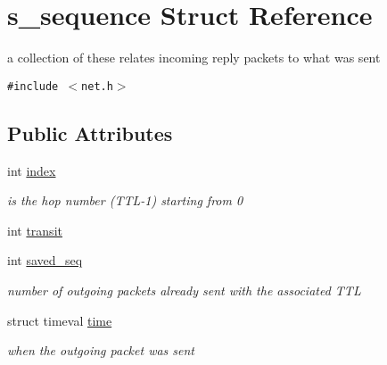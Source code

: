 \hypertarget{structs__sequence}{
\section{s\_\-sequence Struct Reference}
\label{structs__sequence}
}
a collection of these relates incoming reply packets to what was sent  


{\tt \#include $<$net.h$>$}

\subsection*{Public Attributes}
\begin{CompactItemize}
\item 
\hypertarget{structs__sequence_f1371408c6fc56b8755249cf8d2a5db3}{
int \hyperlink{structs__sequence_f1371408c6fc56b8755249cf8d2a5db3}{index}}
\label{structs__sequence_f1371408c6fc56b8755249cf8d2a5db3}

\begin{CompactList}\small\item\em is the hop number (TTL-1) starting from 0 \item\end{CompactList}\item 
int \hyperlink{structs__sequence_23243cbea1f63fecfb2c0fb863e8d8d6}{transit}
\item 
\hypertarget{structs__sequence_1d9d66ef454f719fc13cad810a4e9de9}{
int \hyperlink{structs__sequence_1d9d66ef454f719fc13cad810a4e9de9}{saved\_\-seq}}
\label{structs__sequence_1d9d66ef454f719fc13cad810a4e9de9}

\begin{CompactList}\small\item\em number of outgoing packets already sent with the associated TTL \item\end{CompactList}\item 
\hypertarget{structs__sequence_b48045a227e47d0d52bf026a1c7b857d}{
struct timeval \hyperlink{structs__sequence_b48045a227e47d0d52bf026a1c7b857d}{time}}
\label{structs__sequence_b48045a227e47d0d52bf026a1c7b857d}

\begin{CompactList}\small\item\em when the outgoing packet was sent \item\end{CompactList}\end{CompactItemize}


